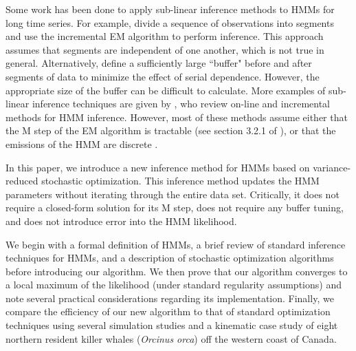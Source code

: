 Some work has been done to apply sub-linear inference methods to HMMs for long time series. For example, \citet{Gotoh:1998} divide a sequence of observations into segments and use the incremental EM algorithm to perform inference. This approach assumes that segments are independent of one another, which is not true in general. Alternatively, \citet{Ye:2017} define a sufficiently large ``buffer" before and after segments of data to minimize the effect of serial dependence. However, the appropriate size of the buffer can be difficult to calculate. More examples of sub-linear inference techniques are given by \citet{Khreich:2012}, who review on-line and incremental methods for HMM inference. However, most of these methods assume either that the M step of the EM algorithm is tractable (see section 3.2.1 of \citet{Khreich:2012}), or that the emissions of the HMM are discrete \citep{Baldi:1993}. 

In this paper, we introduce a new inference method for HMMs based on variance-reduced stochastic optimization. This inference method updates the HMM parameters without iterating through the entire data set. Critically, it does not require a closed-form solution for its M step, does not require any buffer tuning, and does not introduce error into the HMM likelihood.

We begin with a formal definition of HMMs, a brief review of standard inference techniques for HMMs, and a description of stochastic optimization algorithms before introducing our algorithm. We then prove that our algorithm converges to a local maximum of the likelihood (under standard regularity assumptions) and note several practical considerations regarding its implementation. Finally, we compare the efficiency of our new algorithm to that of standard optimization techniques using several simulation studies and a kinematic case study of eight northern resident killer whales ({\em{Orcinus orca}}) off the western coast of Canada. 
